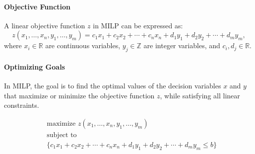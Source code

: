 \documentclass[oneside,11pt,dvipsnames]{book}
\numberwithin{equation}{section}
\theoremstyle{definition}
\theoremstyle{remark}
\begin{document}
\paragraph{Objective Function}
A linear objective function $z$ in MILP can be expressed as:
\[
z(x_1, \ldots, x_n, y_1, \ldots, y_m) = c_1x_1 + c_2x_2 + \cdots + c_nx_n + d_1y_1 + d_2y_2 + \cdots + d_my_m,
\]
where $x_i \in \mathbb{R}$ are continuous variables, $y_j \in \mathbb{Z}$ are integer variables, and $c_i, d_j \in \mathbb{R}$.

\paragraph{Optimizing Goals}
In MILP, the goal is to find the optimal values of the decision variables $x$ and $y$ that maximize or minimize the objective function $z$, while satisfying all linear constraints.

\[
\begin{aligned}
& \text{maximize } z(x_1, \ldots, x_n, y_1, \ldots, y_m) \\
& \text{subject to } \\
& \{c_1x_1 + c_2x_2 + \cdots + c_nx_n + d_1y_1 + d_2y_2 + \cdots + d_my_m \leq b\}
\end{aligned}
\]
\end{document}

